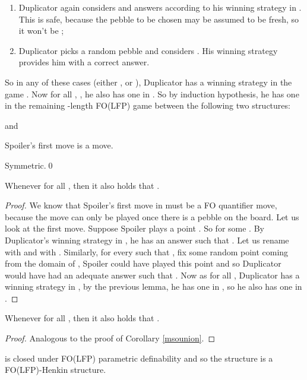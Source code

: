 \documentclass{LMCS}
\newcommand{\fo}{\textsf{FO}\xspace}
\newcommand{\folfp}{\textsf{FO(LFP)}\xspace}
\begin{document}
\begin{iteMize}{}
\begin{enumerate}[1)]
\item  Duplicator again considers  and
answers according to his winning strategy in
. This
is safe, because the pebble to be chosen may be assumed to be fresh, so it
won't be ;
\item   Duplicator picks
a random pebble  and considers
. His winning strategy provides him
with a correct answer.
\end{enumerate}
So in any of these cases (either ,  or ), Duplicator has a
winning strategy in the game
.
Now for all , , he also has one in
.
So by induction hypothesis, he has one in the remaining -length \folfp
game between the following two structures:


and

\item   Spoiler's first move is a  move.

Symmetric.\qed
\end{iteMize}


\begin{cor}
Whenever  for all ,
then it also holds that .\label{folfpfusion}
\end{cor}

\begin{proof}
We know that Spoiler's first move in
 must be a \fo
quantifier move, because the  move can only be played once
there is a pebble on the board. Let us look at the first move.
Suppose Spoiler plays a point . So  for some . By Duplicator's winning strategy in , he has an answer  such that
. Let us rename  with
 and  with . Similarly, for every  such that
, fix some random point  coming from the
domain of , Spoiler could have played this point and so
Duplicator would have had an adequate answer  such that
. Now as for all , Duplicator has a winning strategy in
, by the previous lemma,
he has one in , so he also has one in
.
\end{proof}


\begin{cor}
Whenever  for all ,
then it also holds that .\label{folfpunion}
\end{cor}

\begin{proof}
Analogous to the proof of Corollary \ref{msounion}.
\end{proof}


\begin{cor}
 is closed
under \folfp parametric definability and so the structure  is a \folfp-Henkin
structure.\label{folfphenkinfusion}
\end{cor}
\end{document}
